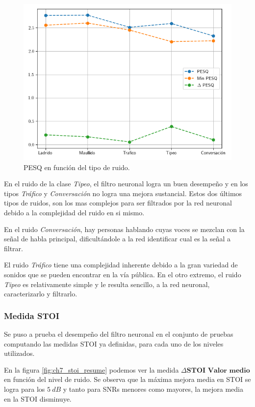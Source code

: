 \begin{figure}
	\centering
	\centerline{\includegraphics[scale=0.75]{images/ch7/dnn_metric_PESQ_noises.png}}
	\caption{PESQ en función del tipo de ruido.}
	\label{fig:ch7_pesq_resume_by_noise}
\end{figure} 

En el ruido de la clase \emph{Tipeo}, el filtro neuronal logra un buen desempeño y en los tipos \emph{Tráfico} y \emph{Conversación} no logra una mejora sustancial. Estos dos últimos tipos de ruidos, son los mas complejos para ser filtrados por la red neuronal debido a la complejidad del ruido en si mismo. 

En el ruido \emph{Conversación}, hay personas hablando cuyas voces se mezclan con la señal de habla principal, dificultándole a la red identificar cual es la señal a filtrar.

El ruido \emph{Tráfico} tiene una complejidad inherente debido a la gran variedad de sonidos que se pueden encontrar en la vía pública. En el otro extremo, el ruido \emph{Tipeo} es relativamente simple y le resulta sencillo, a la red neuronal, caracterizarlo y filtrarlo.


\subsubsection{Medida STOI}

Se puso a prueba el desempeño del filtro neuronal en el conjunto de pruebas computando las medidas STOI ya definidas, para cada uno de los niveles utilizados. 

En la figura \ref{fig:ch7_stoi_resume} podemos ver la medida $\Delta \textbf{STOI Valor medio}$ en función del nivel de ruido. Se observa que la máxima mejora media en STOI se logra para los $\SI{5}{dB}$ y tanto para SNRs menores como mayores, la mejora media en la STOI disminuye.

